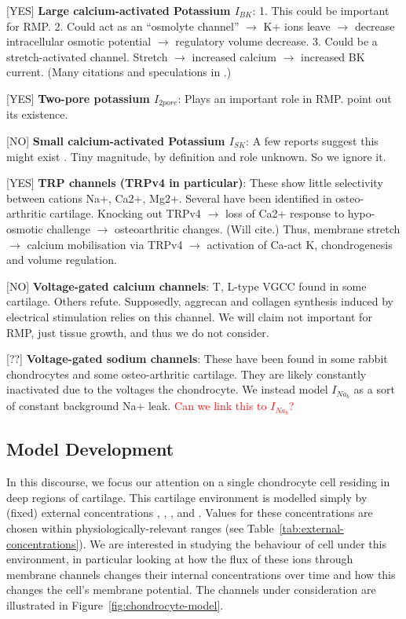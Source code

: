 [YES] {\bf Large calcium-activated Potassium $I_{BK}$}: 1. This could
be important for RMP. 2. Could act as an ``osmolyte channel''
$\rightarrow$ K+ ions leave $\rightarrow$ decrease intracellular
osmotic potential $\rightarrow$ regulatory volume decrease. 3. Could
be a stretch-activated channel. Stretch $\rightarrow$ increased
calcium $\rightarrow$ increased BK current. (Many citations and
speculations in \citet{BarrettJolleyetal2010}.)

[YES] {\bf Two-pore potassium $I_{2 pore}$}: Plays an important role
in RMP. \citep{Clarketal2011} point out its existence.

[NO] {\bf Small calcium-activated Potassium $I_{SK}$}: A few reports
suggest this might exist \citep{Halletal1996,
  BarrettJolleyetal2010}. Tiny magnitude, by definition and role
unknown. So we ignore it.

[YES] {\bf TRP channels (TRPv4 in particular)}: These show little
selectivity between cations Na+, Ca2+, Mg2+. Several have been
identified in osteo-arthritic cartilage. Knocking out TRPv4
$\rightarrow$ loss of Ca2+ response to hypo-osmotic challenge
$\rightarrow$ osteoarthritic changes. (Will cite.) Thus, membrane
stretch $\rightarrow$ calcium mobilisation via TRPv4 $\rightarrow$
activation of Ca-act K, chondrogenesis and volume regulation.

[NO] {\bf Voltage-gated calcium channels}: T, L-type VGCC found in
some cartilage. Others refute. Supposedly, aggrecan and collagen
synthesis induced by electrical stimulation relies on this channel. We
will claim not important for RMP, just tissue growth, and thus we do
not consider.

[??] {\bf Voltage-gated sodium channels}: These have been found in
some rabbit chondrocytes and some osteo-arthritic cartilage. They are
likely constantly inactivated due to the voltages the
chondrocyte.  We instead model $I_{Na_{b}}$ as a sort of constant
background Na+ leak. \textcolor{red}{Can we link this to $I_{Na_{b}}$?}

\subsection{Model Development}
\label{sec:model-development}

In this discourse, we focus our attention on a single chondrocyte cell
residing in deep regions of cartilage. This cartilage environment is
modelled simply by (fixed) external concentrations \Nao, \Ko, \Cao,
and \Ho. Values for these concentrations are chosen within
physiologically-relevant ranges (see
Table~\ref{tab:external-concentrations}). We are interested in
studying the behaviour of cell under this environment, in particular
looking at how the flux of these ions through membrane channels
changes their internal concentrations over time and how this changes
the cell's membrane potential. The channels under consideration are
illustrated in Figure~\ref{fig:chondrocyte-model}.

